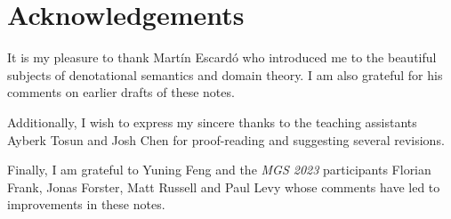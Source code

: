 \chapter{Acknowledgements}

It is my pleasure to thank Mart\'in Escard\'o who introduced me to the beautiful
subjects of denotational semantics and domain theory. I am also grateful for his
comments on earlier drafts of these notes.

Additionally, I wish to express my sincere thanks to the teaching assistants
Ayberk Tosun and Josh Chen for proof-reading and suggesting several
revisions.

Finally, I am grateful to Yuning Feng and the \emph{MGS 2023} participants
Florian Frank, Jonas Forster, Matt Russell and Paul Levy whose comments have led
to improvements in these notes.


